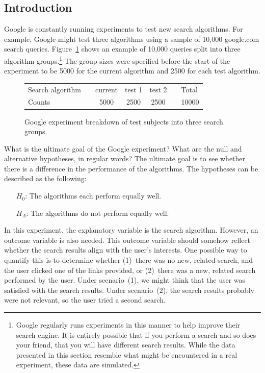 \subsection{Introduction}
Google is constantly running experiments to test new search algorithms. For example, Google might test three algorithms using a sample of 10,000 google.com search queries. Figure~\ref{googleSearchAlgorithmByAlgorithmOnly} shows an example of 10,000 queries split into three algorithm groups.\footnote{Google regularly runs experiments in this manner to help improve their search engine. It is entirely possible that if you perform a search and so does your friend, that you will have different search results. While the data presented in this section resemble what might be encountered in a real experiment, these data are simulated.} The group sizes were specified before the start of the experiment to be 5000 for the current algorithm and 2500 for each test algorithm.

\begin{figure}[h]
\centering
\begin{tabular}{ll ccc ll}
\hline
Search algorithm	 & \hspace{1mm} & current & test 1 & test 2 & \hspace{1mm} & Total \\
Counts &		& 5000 & 2500 & 2500 & & 10000 \\
\hline
\end{tabular}
\caption{Google experiment breakdown of test subjects into three search groups.}
\label{googleSearchAlgorithmByAlgorithmOnly}
\end{figure}


\begin{examplewrap}
\begin{nexample}{What is the ultimate goal of the Google experiment? What are the null and alternative hypotheses, in regular words?}
The ultimate goal is to see whether there is a difference in the performance of the algorithms. The hypotheses can be described as the following:
\begin{itemize}
\item[$H_0$:] The algorithms each perform equally well.
\item[$H_A$:] The algorithms do not perform equally well.
\end{itemize}
\end{nexample}
\end{examplewrap}

In this experiment, the explanatory variable is the search algorithm. However, an outcome variable is also needed. This outcome variable should somehow reflect whether the search results align with the user's interests. One possible way to quantify this is to determine whether (1)~there was no new, related search, and the user clicked one of the links provided, or (2)~there was a new, related search performed by the user. Under scenario~(1), we might think that the user was satisfied with the search results. Under scenario~(2), the search results probably were not relevant, so the user tried a second search.

